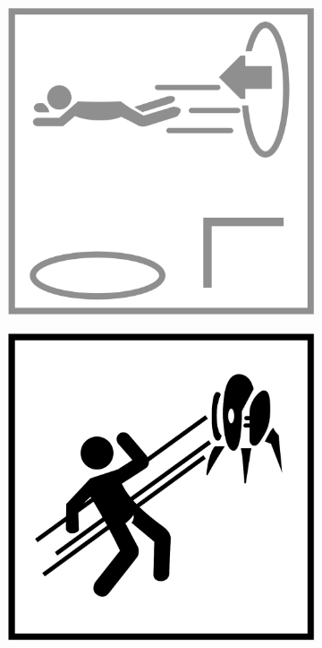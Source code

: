 \begin{figure}[H]
  \begin{subfigure}[l]{0.195\linewidth}
    \includegraphics[width=\textwidth]{Sources/PortalIcons/d6.jpg}
  \end{subfigure}
  \begin{subfigure}[l]{0.195\linewidth}
    \includegraphics[width=\textwidth]{Sources/PortalIcons/7.jpg}

\end{subfigure}
\end{figure}
